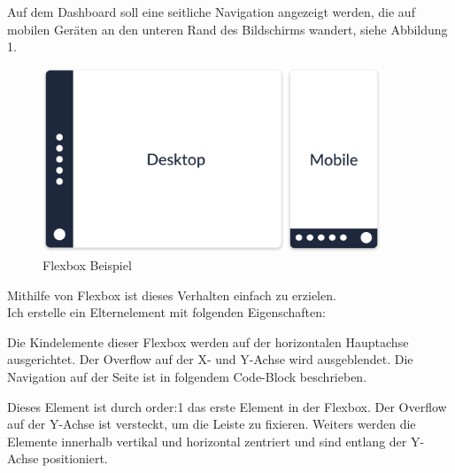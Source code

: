 Auf dem Dashboard soll eine seitliche Navigation angezeigt werden, die
auf mobilen Geräten an den unteren Rand des Bildschirms wandert, siehe
Abbildung 1.

\begin{figure}
\centering
\includegraphics[width=0.9\textwidth]{bilder/Dominik/Flexbox_Illustration_1.png}
\caption{Flexbox Beispiel}
\end{figure}

Mithilfe von Flexbox ist dieses Verhalten einfach zu erzielen.\\
Ich erstelle ein Elternelement mit folgenden Eigenschaften:

\begin{Shaded}
\begin{Highlighting}[]
\NormalTok{\{}
  \NormalTok{: }\NormalTok{;}
\NormalTok{\}}
\end{Highlighting}
\end{Shaded}

Die Kindelemente dieser Flexbox werden auf der horizontalen Hauptachse
ausgerichtet. Der Overflow auf der X- und Y-Achse wird ausgeblendet. Die
Navigation auf der Seite ist in folgendem Code-Block beschrieben.

Dieses Element ist durch order:1 das erste Element in der Flexbox. Der
Overflow auf der Y-Achse ist versteckt, um die Leiste zu fixieren.
Weiters werden die Elemente innerhalb vertikal und horizontal zentriert
und sind entlang der Y-Achse positioniert.

\begin{Shaded}
\begin{Highlighting}[]
\NormalTok{\{}
  \NormalTok{: }\NormalTok{;}
  \NormalTok{: }\NormalTok{;}
  \NormalTok{: }\NormalTok{;}
\NormalTok{\}}
\end{Highlighting}
\end{Shaded}

